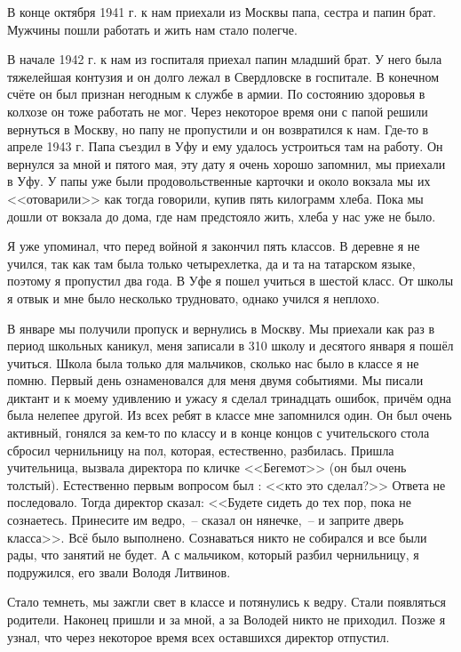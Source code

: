 В конце октября 1941 г. к нам приехали из Москвы папа, сестра и папин брат. Мужчины пошли работать и жить нам стало полегче.

В начале 1942 г. к нам из госпиталя приехал папин младший брат. У него была тяжелейшая контузия и он долго лежал в Свердловске в госпитале. В конечном счёте он был признан негодным к службе в армии. По состоянию здоровья в колхозе он тоже работать не мог. Через некоторое время они с папой решили вернуться в Москву, но папу не пропустили и он возвратился к нам. Где-то в апреле 1943 г. Папа съездил в Уфу и ему удалось устроиться там на работу. Он вернулся за мной и пятого мая, эту дату я очень хорошо запомнил, мы приехали в Уфу. У папы уже были продовольственные карточки и около вокзала мы их <<отоварили>> как тогда говорили, купив пять килограмм хлеба. Пока мы дошли от вокзала до дома, где нам предстояло жить, хлеба у нас уже не было.

Я уже упоминал, что перед войной я закончил пять классов. В деревне я не учился, так как там была только четырехлетка, да и та на татарском языке, поэтому я пропустил два года. В Уфе я пошел учиться в шестой класс. От школы я отвык и мне было несколько трудновато, однако учился я неплохо.

В январе мы получили пропуск и вернулись в Москву. Мы приехали как раз в период школьных каникул, меня записали в 310 школу и десятого января я пошёл учиться. Школа была только для мальчиков, сколько нас было в классе я не помню. Первый день ознаменовался для меня двумя событиями. Мы писали диктант и к моему удивлению и ужасу я сделал тринадцать ошибок, причём одна была нелепее другой. Из всех ребят в классе мне запомнился один. Он был очень активный, гонялся за кем-то по классу и в конце концов с учительского стола сбросил чернильницу на пол, которая, естественно, разбилась. Пришла учительница, вызвала директора по кличке <<Бегемот>> (он был очень толстый). Естественно первым вопросом был : <<кто это сделал?>> Ответа не последовало. Тогда директор сказал: <<Будете сидеть до тех пор, пока не сознаетесь. Принесите им ведро,~-- сказал он нянечке,~-- и заприте дверь класса>>. Всё было выполнено. Сознаваться никто не собирался и все были рады, что занятий не будет. А с мальчиком, который разбил чернильницу, я подружился, его звали Володя Литвинов.

Стало темнеть, мы зажгли свет в классе и потянулись к ведру. Стали появляться родители. Наконец пришли и за мной, а за Володей никто не приходил. Позже я узнал, что через некоторое время всех оставшихся директор отпустил.

